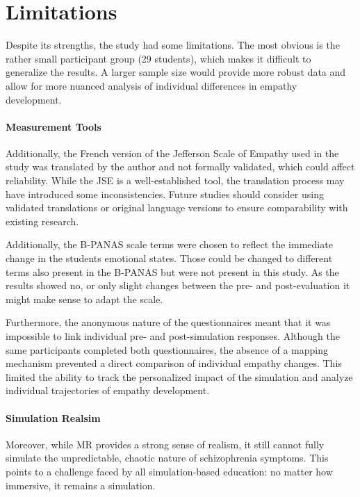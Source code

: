 \section{Limitations}

Despite its strengths, the study had some limitations. The most obvious is the rather small participant group (29 students), which makes it difficult to generalize the results. A larger sample size would provide more robust data and allow for more nuanced analysis of individual differences in empathy development.

\paragraph{Measurement Tools} Additionally, the French version of the Jefferson Scale of Empathy used in the study was translated by the author and not formally validated, which could affect reliability. While the JSE is a well-established tool, the translation process may have introduced some inconsistencies. Future studies should consider using validated translations or original language versions to ensure comparability with existing research.

\vspace{1em}

Additionally, the B-PANAS scale terms were chosen to reflect the immediate change in the students emotional states. Those could be changed to different terms also present in the B-PANAS but were not present in this study. As the results showed no, or only slight changes between the pre- and post-evaluation it might make sense to adapt the scale.

\vspace{1em}

Furthermore, the anonymous nature of the questionnaires meant that it was impossible to link individual pre- and post-simulation responses. Although the same participants completed both questionnaires, the absence of a mapping mechanism prevented a direct comparison of individual empathy changes. This limited the ability to track the personalized impact of the simulation and analyze individual trajectories of empathy development.


\paragraph{Simulation Realsim} Moreover, while MR provides a strong sense of realism, it still cannot fully simulate the unpredictable, chaotic nature of schizophrenia symptoms. This points to a challenge faced by all simulation-based education: no matter how immersive, it remains a simulation. 

